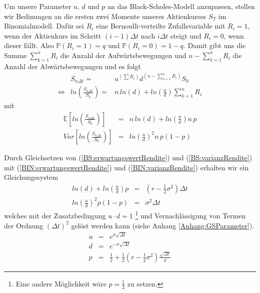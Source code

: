 Um unsere Parameter $u, \, d$ und $p$ an das Black-Scholes-Modell anzupassen, stellen wir Bedinungen an die ersten zwei Momente unseres Aktienkurses $S_T$ im Binomialmodell. Dafür sei $R_i$ eine Bernoulli-verteilte Zufallsvariable mit $R_i = 1$, wenn der Aktienkurs im Schritt $(i-1)\Delta t$ nach $i\Delta t$ steigt und $R_i = 0$, wenn dieser fällt. Also $\mathbb{P}\left(R_i=1 \right) = q$ und $\mathbb{P}\left(R_i=0 \right) = 1-q$. Damit gibt uns die Summe $\sum_{k=1}^{n}R_i$ die Anzahl der Aufwärtsbewegungen und $ n - \sum_{k=1}^{n}R_i$ die Anzahl der Abwärtsbewegungen und es folgt
\begin{eqnarray}
                & S_{n\Delta t} =                     & u^{\left(\sum R_i\right)}d^{\left(n-\sum_{k=1}^{n}R_i\right)}S_0 \nonumber \label{BIN:aktienkurs} \\
\Leftrightarrow & ln\left(\frac{S_{n\Delta t}}{S_0}\right) = & n \, ln(d) + ln\left(\frac{u}{d}\right)\sum_{k=1}^{n}R_i \label{BIN:aktienkursrendite}
\end{eqnarray}
mit
\begin{eqnarray}
\mathbb{E}\left[ ln\left(\tfrac{S_{n\Delta t}}{S_0}\right) \right] & = & n \, ln(d) + ln\left(\frac{u}{d}\right)n\,p \label{BIN:erwartungswertRendite}\\
Var\left[ ln\left(\tfrac{S_{n\Delta t}}{S_0}\right) \right]        & = & ln \left(\tfrac{u}{d}\right)^2n\,p(1-p) \label{BIN:varianzRendite}
\end{eqnarray}

Durch Gleichsetzen von (\ref{BS:erwartungswertRendite}) und (\ref{BS:varianzRendite}) mit (\ref{BIN:erwartungswertRendite}) und (\ref{BIN:varianzRendite}) erhalten wir ein Gleichungssystem
\begin{eqnarray}
ln(d) + ln\left(\frac{u}{d}\right)p & = & \left( r - \tfrac{1}{2}\sigma^2\right)\Delta t \label{BIN:GS1} \\
ln \left(\frac{u}{d}\right)^2p(1-p)     & = &  \sigma^2\Delta t \label{BIN:GS2}
\end{eqnarray}
welches mit der Zusatzbedingung $u\cdot d = 1$ \footnote{Eine andere Möglichkeit wäre $p = \frac{1}{2}$ zu setzen.} und Vernachlässigung von Termen der Ordnung $\left(\Delta t\right)^2$ gelöst werden kann (siehe Anhang \ref{Anhang:GSParameter}).
\begin{eqnarray}
u & = & e^{\sigma \sqrt{\Delta t}} \nonumber \\
d & = & e^{-\sigma \sqrt{\Delta t}} \label{BIN:parameter} \\
p & = & \tfrac{1}{2} + \tfrac{1}{2}\left(r-\tfrac{1}{2} \sigma^2\right)\tfrac{\sqrt{\Delta t}}{\sigma} \nonumber
\end{eqnarray}

